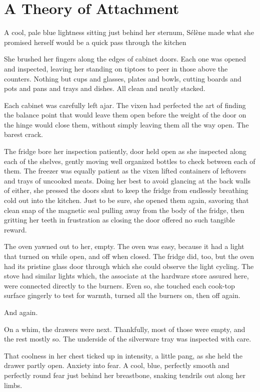 \hypertarget{a-theory-of-attachment}{%
\chapter{A Theory of Attachment}\label{a-theory-of-attachment}}

A cool, pale blue lightness sitting just behind her sternum, Sélène made what she promised herself would be a quick pass through the kitchen

She brushed her fingers along the edges of cabinet doors. Each one was opened and inspected, leaving her standing on tiptoes to peer in those above the counters. Nothing but cups and glasses, plates and bowls, cutting boards and pots and pans and trays and dishes. All clean and neatly stacked.

Each cabinet was carefully left ajar. The vixen had perfected the art of finding the balance point that would leave them open before the weight of the door on the hinge would close them, without simply leaving them all the way open. The barest crack.

The fridge bore her inspection patiently, door held open as she inspected along each of the shelves, gently moving well organized bottles to check between each of them. The freezer was equally patient as the vixen lifted containers of leftovers and trays of uncooked meats. Doing her best to avoid glancing at the back walls of either, she pressed the doors shut to keep the fridge from endlessly breathing cold out into the kitchen. Just to be sure, she opened them again, savoring that clean snap of the magnetic seal pulling away from the body of the fridge, then gritting her teeth in frustration as closing the door offered no such tangible reward.

The oven yawned out to her, empty. The oven was easy, because it had a light that turned on while open, and off when closed. The fridge did, too, but the oven had its pristine glass door through which she could observe the light cycling. The stove had similar lights which, the associate at the hardware store assured here, were connected directly to the burners. Even so, she touched each cook-top surface gingerly to test for warmth, turned all the burners on, then off again.

And again.

On a whim, the drawers were next. Thankfully, most of those were empty, and the rest mostly so. The underside of the silverware tray was inspected with care.

That coolness in her chest ticked up in intensity, a little pang, as she held the drawer partly open. Anxiety into fear. A cool, blue, perfectly smooth and perfectly round fear just behind her breastbone, snaking tendrils out along her limbs.

